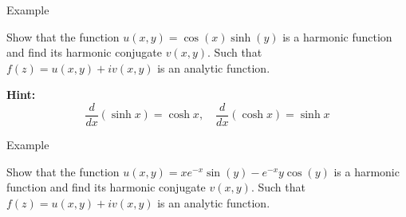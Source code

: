 \documentclass[11pt]{beamer}
\theoremstyle{plain}
\begin{document}
\begin{frame}{Example}
\begin{example}
Show that the function $u(x,y) = \cos(x)\sinh(y)$ is a harmonic function and find its harmonic conjugate $v(x,y)$.
Such that $f(z) = u(x,y) + iv(x,y)$ is an analytic function.
\end{example}
\textbf{Hint: }
$$\frac{d}{dx}(\sinh x)=\cosh x, \quad \frac{d}{dx}(\cosh x)=\sinh x$$
\end{frame}

\begin{frame}{Example}
\begin{example}
Show that the function $u(x,y) = xe^{-x}\sin(y)-e^{-x}y\cos(y)$ is a harmonic function and find its harmonic conjugate $v(x,y)$.
Such that $f(z) = u(x,y) + iv(x,y)$ is an analytic function.
\end{example}
\end{frame}
\end{document}

